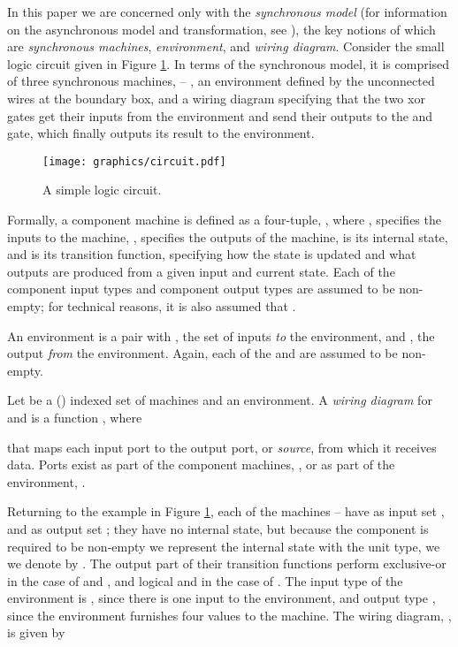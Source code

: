 \documentclass[copyright,creativecommons]{eptcs}
\begin{document}
In this paper we are concerned only with the \emph{synchronous model} (for
information on the asynchronous model and transformation, see
\cite{meseguer_2010_01,meseguer_2009_01}), the key notions of which are \emph{synchronous
machines}, \emph{environment}, and \emph{wiring diagram}. Consider the small
logic circuit given in Figure \ref{fig:circuit}. In terms of the synchronous
model, it is comprised of three synchronous machines,  -- , an
environment defined by the unconnected wires at the boundary box, and a wiring
diagram specifying that the two xor gates get their inputs from the environment
and send their outputs to the and gate, which finally outputs its result to the
environment.

\begin{figure}
\begin{center}
\texttt{[image: graphics/circuit.pdf]}
\end{center}
\caption{A simple logic circuit.}
\label{fig:circuit}
\end{figure}
 
Formally, a component machine  is defined as a four-tuple, , where , specifies the inputs to the machine, , specifies the outputs of the machine,
 is its internal state, and  is its transition function, specifying
how the state is updated and what outputs are produced from a given input and
current state. Each of the component input types  and
component output types  are assumed to be non-empty; for
technical reasons, it is also assumed that .

An environment is a pair  with , the set of inputs \emph{to} the environment,
and , the output
\emph{from} the environment.  Again, each of the
 and  are
assumed to be non-empty.

Let  be a () indexed set of machines and  an environment. A \emph{wiring diagram} for 
and  is a function , where 

that maps each input port to the output port, or \emph{source}, from which it
receives data. Ports exist as part of the component machines, , or as part of the environment, .

Returning to the example in Figure \ref{fig:circuit}, each of the machines
 --  have as input set , and as output set ;
they have no internal state, but because the  component is required to be
non-empty we represent the internal state with the unit type, we we denote by .
The output part of their transition functions perform exclusive-or in the case
of  and , and logical and in the case of . The input type of the
environment is , since there is one input to the environment, and
output type , since the environment furnishes four values to the
machine. The wiring diagram, , is given by
\end{document}
